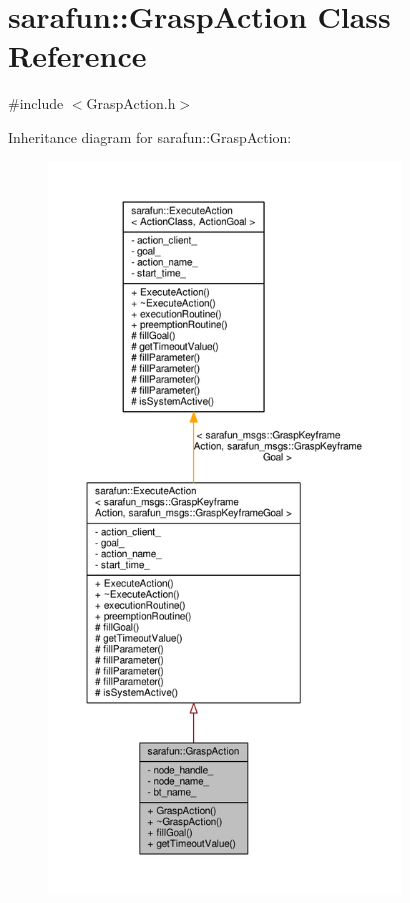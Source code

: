 \hypertarget{classsarafun_1_1GraspAction}{\section{sarafun\-:\-:Grasp\-Action Class Reference}
\label{classsarafun_1_1GraspAction}
}


{\ttfamily \#include $<$Grasp\-Action.\-h$>$}



Inheritance diagram for sarafun\-:\-:Grasp\-Action\-:\nopagebreak
\begin{figure}[H]
\begin{center}
\leavevmode
\includegraphics[height=550pt]{de/d55/classsarafun_1_1GraspAction__inherit__graph}
\end{center}
\end{figure}


